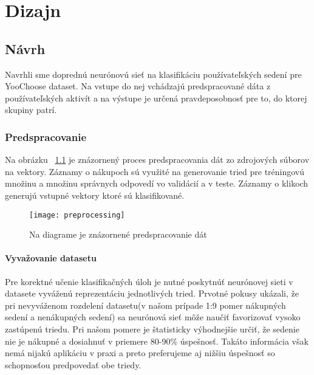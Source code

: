 \newpage
\chapter{Dizajn} 

\section{Návrh}
\label{design}

Navrhli sme doprednú neurónovú sieť na klasifikáciu používateľských sedení pre YooChoose dataset. Na vstupe do nej vchádzajú predspracované dáta z používateľských aktivít a na výstupe je určená pravdeposobnosť pre to, do ktorej skupiny patrí.

\subsection{Predspracovanie}

Na obrázku ~\ref{fig:preprocessing} je znázornený proces predspracovania dát zo zdrojových súborov na vektory. Záznamy o nákupoch sú využité na generovanie tried pre tréningovú množinu a množinu správnych odpovedí vo validácií a v teste. Záznamy o klikoch generujú vstupné vektory ktoré sú klasifikované.

\begin{figure}[H]
	\begin{center}
		\texttt{[image: preprocessing]}\end{center}
	\caption[preprocessing]{Na diagrame je znázornené predspracovanie dát}
	\label{fig:preprocessing}
\end{figure}

\subsubsection{Vyvažovanie datasetu}
Pre korektné učenie klasifikačných úloh je nutné poskytnúť neurónovej sieti v datasete vyváženú reprezentáciu jednotlivých tried. Prvotné pokusy ukázali, že pri nevyváženom rozdelení datasetu(v našom prípade 1:9 pomer nákupných sedení a nenákupných sedení) sa neurónová sieť môže naučiť favorizovať vysoko zastúpenú triedu. \newline
Pri našom pomere je štatisticky výhodnejšie určiť, že sedenie nie je nákupné a dosiahnuť v priemere 80-90\% úspešnosť. Takáto informácia však nemá nijakú aplikáciu v praxi a preto preferujeme aj nižšiu úspešnosť so schopnosťou predpovedať obe triedy.\newline

